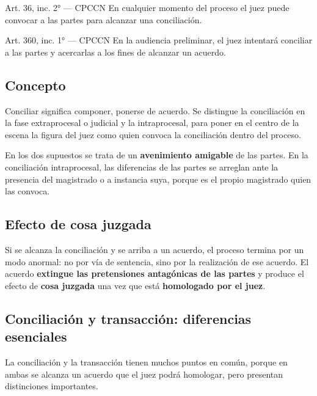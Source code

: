 \documentclass[12pt,oneside]{book}
\begin{document}
\begin{articulo}{Art. 36, inc. 2° --- CPCCN}
En cualquier momento del proceso el juez puede convocar a las partes para alcanzar una conciliación.
\end{articulo}

\begin{articulo}{Art. 360, inc. 1° --- CPCCN}
En la audiencia preliminar, el juez intentará conciliar a las partes y acercarlas a los fines de alcanzar un acuerdo.
\end{articulo}

\subsection{Concepto}

Conciliar significa componer, ponerse de acuerdo. %
Se distingue la conciliación en la fase extraprocesal o judicial y la intraprocesal, para poner en el centro de la escena la figura del juez como quien convoca la conciliación dentro del proceso.

En los dos supuestos se trata de un \textbf{avenimiento amigable} de las partes. En la conciliación intraprocesal, las diferencias de las partes se arreglan ante la presencia del magistrado o a instancia suya, porque es el propio magistrado quien las convoca.

\subsection{Efecto de cosa juzgada}

Si se alcanza la conciliación y se arriba a un acuerdo, el proceso termina por un modo anormal: no por vía de sentencia, sino por la realización de ese acuerdo. El acuerdo \textbf{extingue las pretensiones antagónicas de las partes} y produce el efecto de \textbf{cosa juzgada} una vez que está \textbf{homologado por el juez}.

\subsection{Conciliación y transacción: diferencias esenciales}

La conciliación y la transacción tienen muchos puntos en común, porque en ambas se alcanza un acuerdo que el juez podrá homologar, pero presentan distinciones importantes.
\end{document}
